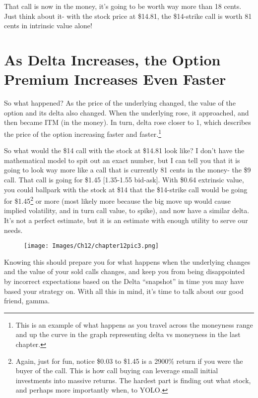That call is now in the money, it’s going to be worth way more than 18 cents. Just think about it- with the stock price at \$14.81, the \$14-strike call is worth 81 cents in intrinsic value alone! 

\section{As Delta Increases, the Option\\ Premium Increases Even Faster}

So what happened? As the price of the underlying changed, the value of the option and its delta also changed. When the underlying rose, it approached, and then became ITM (in the money). In turn, delta rose closer to 1, which describes the price of the option increasing faster and faster.\footnote{This is an example of what happens as you travel across the moneyness range and up the curve in the graph representing delta vs moneyness in the last chapter.} 

So what would the \$14 call with the stock at \$14.81 look like? I don’t have the mathematical model to spit out an exact number, but I can tell you that it is going to look way more like a call that is currently 81 cents in the money- the \$9 call. That call is going for \$1.45 [1.35-1.55 bid-ask]. With \$0.64 extrinsic value, you could ballpark with the stock at \$14 that the \$14-strike call would be going for \$1.45\footnote{Again, just for fun, notice \$0.03 to \$1.45 is a 2900\% return if you were the buyer of the call. This is how call buying can leverage small initial investments into massive returns. The hardest part is finding out what stock, and perhaps more importantly when, to YOLO.} or more (most likely more because the big move up would cause implied volatility, and in turn call value, to spike), and now have a similar delta.  It’s not a perfect estimate, but it is an estimate with enough utility to serve our needs.

\begin{figure}[H]
  \centering
    \texttt{[image: Images/Ch12/chapter12pic3.png]}
\end{figure}

Knowing this should prepare you for what happens when the underlying changes and the value of your sold calls changes, and keep you from being disappointed by incorrect expectations based on the Delta “snapshot” in time you may have based your strategy on. With all this in mind, it's time to talk about our good friend, gamma.